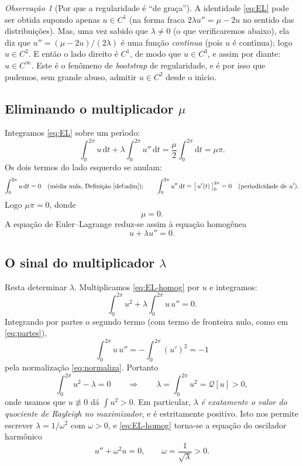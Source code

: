 \documentclass[11pt,a4paper]{amsart}
\renewcommand{\d}{\mathrm{d}}
\newcommand{\Q}{\mathcal{Q}}
\theoremstyle{plain}
\theoremstyle{definition}
\theoremstyle{remark}
\newtheorem{observacao}[teorema]{Observação}
\begin{document}
\begin{observacao}[Por que a regularidade \'e ``de gra\c{c}a'']\label{obs:bootstrap}
A identidade \eqref{eq:EL} pode ser obtida supondo apenas $u\in C^1$ (na forma
fraca $2\lambda u'' = \mu - 2u$ no sentido das distribui\c{c}\~oes). Mas, uma
vez sabido que $\lambda\neq 0$ (o que verificaremos abaixo), ela diz que
$u'' = (\mu - 2u)/(2\lambda)$ \'e uma fun\c{c}\~ao \emph{cont\'\i nua} (pois
$u$ \'e cont\'\i nua); logo $u\in C^2$. E ent\~ao o lado direito \'e $C^1$, de
modo que $u\in C^3$, e assim por diante: $u\in C^\infty$. Este \'e o fen\^omeno
de \emph{bootstrap} de regularidade, e \'e por isso que pudemos, sem grande
abuso, admitir $u\in C^2$ desde o in\'\i cio.
\end{observacao}

\subsection{Eliminando o multiplicador $\mu$}

Integramos \eqref{eq:EL} sobre um per\'\i odo:
\[
  \int_0^{2\pi} u \,\d t
  + \lambda \int_0^{2\pi} u'' \,\d t
  = \frac{\mu}{2}\int_0^{2\pi}\d t = \mu\pi .
\]
Os dois termos do lado esquerdo se anulam:
\[
  \int_0^{2\pi} u \,\d t = 0
  \quad\text{(m\'edia nula, Defini\c{c}\~ao~\ref{def:adm});}
  \qquad
  \int_0^{2\pi} u'' \,\d t = \big[\,u'(t)\,\big]_0^{2\pi} = 0
  \quad\text{(periodicidade de $u'$).}
\]
Logo $\mu\pi = 0$, donde
\begin{equation}\label{eq:mu-zero}
  \mu = 0 .
\end{equation}
A equa\c{c}\~ao de Euler--Lagrange reduz-se assim \`a equa\c{c}\~ao homog\^enea
\begin{equation}\label{eq:EL-homog}
  u + \lambda u'' = 0 .
\end{equation}

\subsection{O sinal do multiplicador $\lambda$}

Resta determinar $\lambda$. Multiplicamos \eqref{eq:EL-homog} por $u$ e
integramos:
\[
  \int_0^{2\pi} u^2 + \lambda\int_0^{2\pi} u\,u'' = 0 .
\]
Integrando por partes o segundo termo (com termo de fronteira nulo, como em
\eqref{eq:partes}),
\[
  \int_0^{2\pi} u\,u'' = -\int_0^{2\pi}(u')^2 = -1
\]
pela normaliza\c{c}\~ao \eqref{eq:normaliza}. Portanto
\begin{equation}\label{eq:lambda}
  \int_0^{2\pi} u^2 - \lambda = 0
  \qquad\Longrightarrow\qquad
  \lambda = \int_0^{2\pi} u^2 = \Q[u] > 0 ,
\end{equation}
onde usamos que $u\not\equiv 0$ d\'a $\int u^2>0$. Em particular,
\emph{$\lambda$ \'e exatamente o valor do quociente de Rayleigh no
maximizador}, e \'e estritamente positivo. Isto nos permite escrever
$\lambda = 1/\omega^2$ com $\omega>0$, e \eqref{eq:EL-homog} torna-se a
equa\c{c}\~ao do oscilador harm\^onico
\begin{equation}\label{eq:oscilador}
  u'' + \omega^2 u = 0,
  \qquad \omega = \frac{1}{\sqrt{\lambda}} > 0 .
\end{equation}
\end{document}
